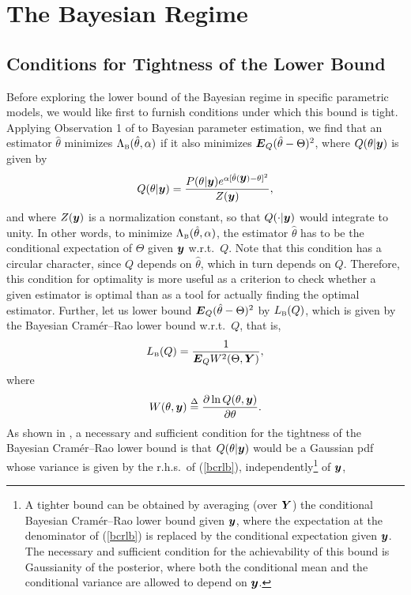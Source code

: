 \documentclass[11pt,epsf]{article}
\newcommand {\dfn} {\stackrel{\Delta} {=}}
\newcommand{\ct}{\hat{\theta}}
\newcommand {\by} {\mbox{\boldmath $y$}}
\newcommand {\bE} {\mbox{\boldmath $E$}}
\newcommand {\bY} {\mbox{\boldmath $Y$}}
\begin{document}
\section{The Bayesian Regime}

\subsection{Conditions for Tightness of the Lower Bound}

Before exploring the lower bound of the Bayesian regime in specific parametric
models, we would like first to furnish conditions under which this bound
is tight. Applying Observation 1 of \cite[p.\ 347]{p143} to Bayesian parameter
estimation, we find that an estimator $\ct$ minimizes $\Lambda_{\mbox{\tiny
B}}(\ct,\alpha)$ if it also minimizes $\bE_Q(\ct-\Theta)^2$, where
$Q(\theta|\by)$ is given by
\begin{equation}
\label{obs1}
Q(\theta|\by)=\frac{P(\theta|\by)e^{\alpha[\ct(\by)-\theta]^2}}{Z(\by)},
\end{equation}
and where $Z(\by)$ is a normalization constant, so that $Q(\cdot|\by)$ 
would integrate to unity.
In other words, to minimize $\Lambda_{\mbox{\tiny B}}(\ct,\alpha)$,
the estimator $\ct$ has to be the conditional expectation of $\Theta$ given
$\by$ w.r.t.\ $Q$. Note that this condition has a circular character, since
$Q$ depends on $\ct$, which in turn depends on $Q$. Therefore, this condition
for optimality is more useful as a criterion to check whether a given estimator is
optimal than as a tool for actually finding the optimal estimator.
Further, let us lower bound $\bE_Q(\ct-\Theta)^2$ by 
$L_{\mbox{\tiny B}}(Q)$, which is given by the Bayesian Cram\'er--Rao lower
bound \cite{vantrees} w.r.t.\ $Q$, that is,
\begin{equation}
\label{bcrlb}
L_{\mbox{\tiny B}}(Q)=\frac{1}{\bE_Q W^2(
\Theta,\bY)},
\end{equation}
where
\begin{equation}
W(\theta,\by)\dfn\frac{\partial\ln Q(\theta,\by)}{\partial\theta}.
\end{equation}
As shown in \cite[p.\ 73]{vantrees}, a necessary and sufficient condition
for the tightness of the Bayesian Cram\'er--Rao lower bound is that
$Q(\theta|\by)$ would be a Gaussian pdf
whose variance is
given by the r.h.s.\ of (\ref{bcrlb}), independently\footnote{A tighter bound
can be obtained by averaging (over $\bY$) the conditional Bayesian 
Cram\'er--Rao lower
bound given $\by$,
where the expectation at the denominator of (\ref{bcrlb}) is replaced
by the conditional expectation given $\by$. The necessary and sufficient
condition for the achievability of this bound is Gaussianity of the posterior,
where both the conditional mean and the conditional variance are allowed to
depend on $\by$.} of $\by$,
\end{document}
